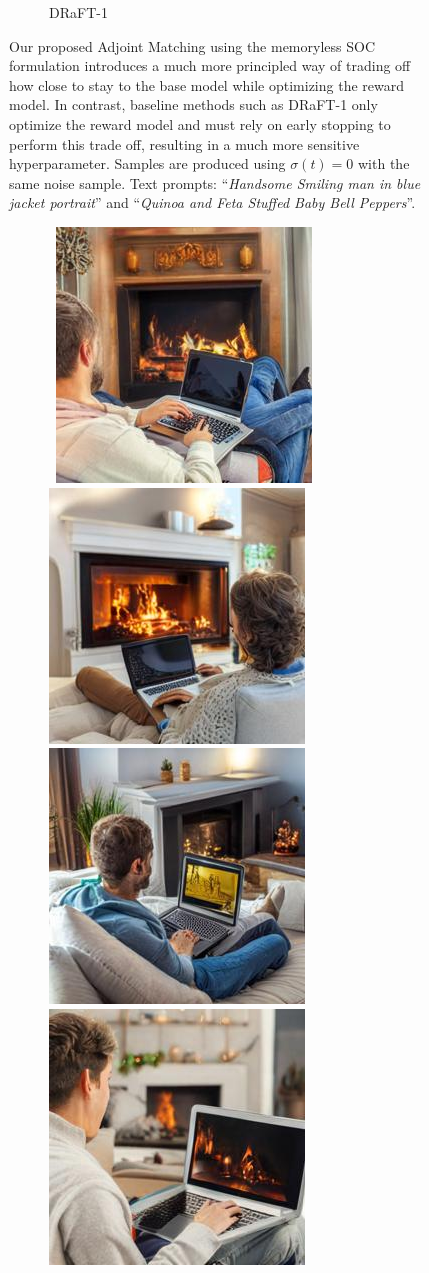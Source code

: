 \documentclass[]{fairmeta}
\begin{document}
\begin{figure}[t!]
\begin{subfigure}[t]{0.49\linewidth}
        \caption*{DRaFT-1}
    \end{subfigure}
    \caption{Our proposed Adjoint Matching using the memoryless SOC formulation introduces a much more principled way of trading off how close to stay to the base model while optimizing the reward model. In contrast, baseline methods such as DRaFT-1 only optimize the reward model and must rely on early stopping to perform this trade off, resulting in a much more sensitive hyperparameter. Samples are produced using $\sigma(t)=0$ with the same noise sample. Text prompts: ``\textit{Handsome Smiling man in blue jacket portrait}'' and ``\textit{Quinoa and Feta Stuffed Baby Bell Peppers}''.}
    \label{fig:ablation_tradeoff_lambda}
\end{figure}

\begin{figure}[t!]
    \centering
    \begin{subfigure}[t]{0.49\linewidth}
        \centering
        \,%
        \includegraphics[width=0.24\linewidth]{figs/samples/adjmat0.0_prompt_37_image_3.jpg}\,%
        \includegraphics[width=0.24\linewidth]{figs/samples/adjmat0.0_prompt_37_image_5.jpg}\,%
        \includegraphics[width=0.24\linewidth]{figs/samples/adjmat0.0_prompt_37_image_6.jpg}\,%
        \includegraphics[width=0.24\linewidth]{figs/samples/adjmat0.0_prompt_37_image_7.jpg}\\

\end{subfigure}
\end{figure}
\end{document}
